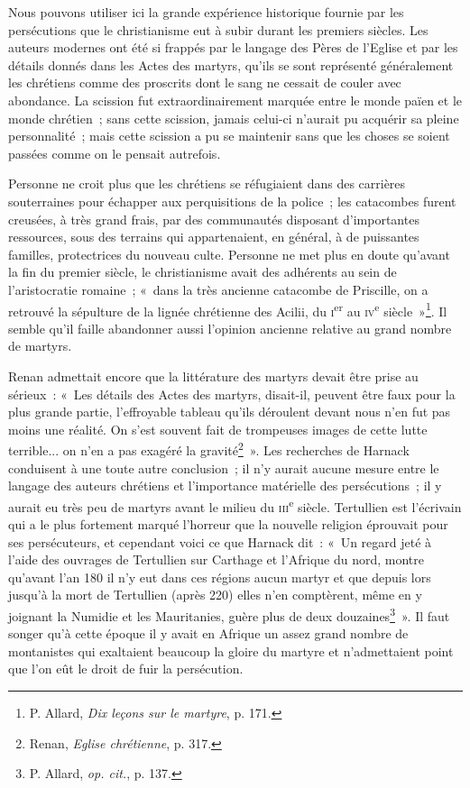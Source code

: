 \documentclass[french,twoside]{book} %
\begin{document}
\noindent Nous pouvons utiliser ici la grande expérience historique fournie par les persécutions que le christianisme eut à subir durant les premiers siècles. Les auteurs modernes ont été si frappés par le langage des Pères de l’Eglise et par les détails donnés dans les Actes des martyrs, qu’ils se sont représenté généralement les chrétiens comme des proscrits dont le sang ne cessait de couler avec abondance. La scission fut extraordinairement marquée entre le monde païen et le monde chrétien ; sans cette scission, jamais celui-ci n’aurait pu acquérir sa pleine personnalité ; mais cette scission a pu se maintenir sans que les choses se soient passées comme on le pensait autrefois.\par
Personne ne croit plus que les chrétiens se réfugiaient dans des carrières souterraines pour échapper aux perquisitions de la police ; les catacombes furent creusées, à très grand frais, par des communautés disposant d’importantes ressources, sous des terrains qui appartenaient, en général, à de puissantes familles, protectrices du nouveau culte. Personne ne met plus en doute qu’avant la fin du premier siècle, le christianisme avait des adhérents au sein de l’aristocratie romaine ; « dans la très ancienne catacombe de Priscille, on a retrouvé la  sépulture de la lignée chrétienne des Acilii, du {\scshape i}\textsuperscript{er} au {\scshape iv}\textsuperscript{e} siècle »\footnote{ \noindent P. Allard, \emph{Dix leçons sur le martyre}, p. 171.
 }. Il semble qu’il faille abandonner aussi l’opinion ancienne relative au grand nombre de martyrs.\par
Renan admettait encore que la littérature des martyrs devait être prise au sérieux : « Les détails des Actes des martyrs, disait-il, peuvent être faux pour la plus grande partie, l’effroyable tableau qu’ils déroulent devant nous n’en fut pas moins une réalité. On s’est souvent fait de trompeuses images de cette lutte terrible... on n’en a pas exagéré la gravité\footnote{ \noindent Renan, \emph{Eglise chrétienne}, p. 317.
 } ». Les recherches de Harnack conduisent à une toute autre conclusion ; il n’y aurait aucune mesure entre le langage des auteurs chrétiens et l’importance matérielle des persécutions ; il y aurait eu très peu de martyrs avant le milieu du {\scshape iii}\textsuperscript{e} siècle. Tertullien est l’écrivain qui a le plus fortement marqué l’horreur que la nouvelle religion éprouvait pour ses persécuteurs, et cependant voici ce que Harnack dit : « Un regard jeté à l’aide des ouvrages de Tertullien sur Carthage et l’Afrique du nord, montre qu’avant l’an 180 il n’y eut dans ces régions aucun martyr et que depuis lors jusqu’à la mort de Tertullien (après 220) elles n’en comptèrent, même en y joignant la Numidie et les Mauritanies, guère plus de deux douzaines\footnote{ \noindent P. Allard, \emph{op. cit.}, p. 137.
 } ». Il faut songer qu’à cette époque il y avait en Afrique un assez grand nombre de montanistes qui exaltaient beaucoup la gloire du martyre et n’admettaient point que l’on eût le droit de fuir la persécution.\par
\end{document}
